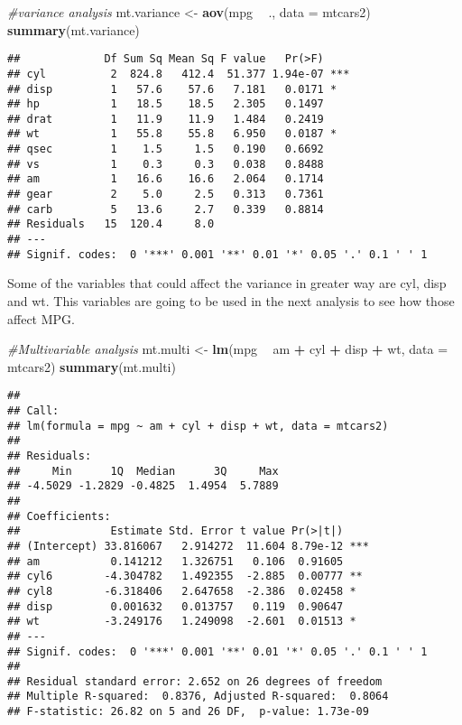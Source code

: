 \documentclass[
]{article}
\newenvironment{Shaded}{\begin{snugshade}}{\end{snugshade}}
\newcommand{\CommentTok}[1]{\textcolor[rgb]{0.56,0.35,0.01}{\textit{#1}}}
\newcommand{\DataTypeTok}[1]{\textcolor[rgb]{0.13,0.29,0.53}{#1}}
\newcommand{\KeywordTok}[1]{\textcolor[rgb]{0.13,0.29,0.53}{\textbf{#1}}}
\newcommand{\NormalTok}[1]{#1}
\newcommand{\OperatorTok}[1]{\textcolor[rgb]{0.81,0.36,0.00}{\textbf{#1}}}
\newcommand{\StringTok}[1]{\textcolor[rgb]{0.31,0.60,0.02}{#1}}
\begin{document}
\begin{Shaded}
\begin{Highlighting}[]
\CommentTok{#variance analysis}
\NormalTok{mt.variance <-}\StringTok{ }\KeywordTok{aov}\NormalTok{(mpg }\OperatorTok{~}\StringTok{ }\NormalTok{., }\DataTypeTok{data =}\NormalTok{ mtcars2)}
\KeywordTok{summary}\NormalTok{(mt.variance)}
\end{Highlighting}
\end{Shaded}

\begin{verbatim}
##             Df Sum Sq Mean Sq F value   Pr(>F)    
## cyl          2  824.8   412.4  51.377 1.94e-07 ***
## disp         1   57.6    57.6   7.181   0.0171 *  
## hp           1   18.5    18.5   2.305   0.1497    
## drat         1   11.9    11.9   1.484   0.2419    
## wt           1   55.8    55.8   6.950   0.0187 *  
## qsec         1    1.5     1.5   0.190   0.6692    
## vs           1    0.3     0.3   0.038   0.8488    
## am           1   16.6    16.6   2.064   0.1714    
## gear         2    5.0     2.5   0.313   0.7361    
## carb         5   13.6     2.7   0.339   0.8814    
## Residuals   15  120.4     8.0                     
## ---
## Signif. codes:  0 '***' 0.001 '**' 0.01 '*' 0.05 '.' 0.1 ' ' 1
\end{verbatim}

Some of the variables that could affect the variance in greater way are
cyl, disp and wt. This variables are going to be used in the next
analysis to see how those affect MPG.

\begin{Shaded}
\begin{Highlighting}[]
\CommentTok{#Multivariable analysis}
\NormalTok{mt.multi <-}\StringTok{ }\KeywordTok{lm}\NormalTok{(mpg }\OperatorTok{~}\StringTok{ }\NormalTok{am }\OperatorTok{+}\StringTok{ }\NormalTok{cyl }\OperatorTok{+}\StringTok{ }\NormalTok{disp }\OperatorTok{+}\StringTok{ }\NormalTok{wt, }\DataTypeTok{data =}\NormalTok{ mtcars2)}
\KeywordTok{summary}\NormalTok{(mt.multi)}
\end{Highlighting}
\end{Shaded}

\begin{verbatim}
## 
## Call:
## lm(formula = mpg ~ am + cyl + disp + wt, data = mtcars2)
## 
## Residuals:
##     Min      1Q  Median      3Q     Max 
## -4.5029 -1.2829 -0.4825  1.4954  5.7889 
## 
## Coefficients:
##              Estimate Std. Error t value Pr(>|t|)    
## (Intercept) 33.816067   2.914272  11.604 8.79e-12 ***
## am           0.141212   1.326751   0.106  0.91605    
## cyl6        -4.304782   1.492355  -2.885  0.00777 ** 
## cyl8        -6.318406   2.647658  -2.386  0.02458 *  
## disp         0.001632   0.013757   0.119  0.90647    
## wt          -3.249176   1.249098  -2.601  0.01513 *  
## ---
## Signif. codes:  0 '***' 0.001 '**' 0.01 '*' 0.05 '.' 0.1 ' ' 1
## 
## Residual standard error: 2.652 on 26 degrees of freedom
## Multiple R-squared:  0.8376, Adjusted R-squared:  0.8064 
## F-statistic: 26.82 on 5 and 26 DF,  p-value: 1.73e-09
\end{verbatim}
\end{document}
